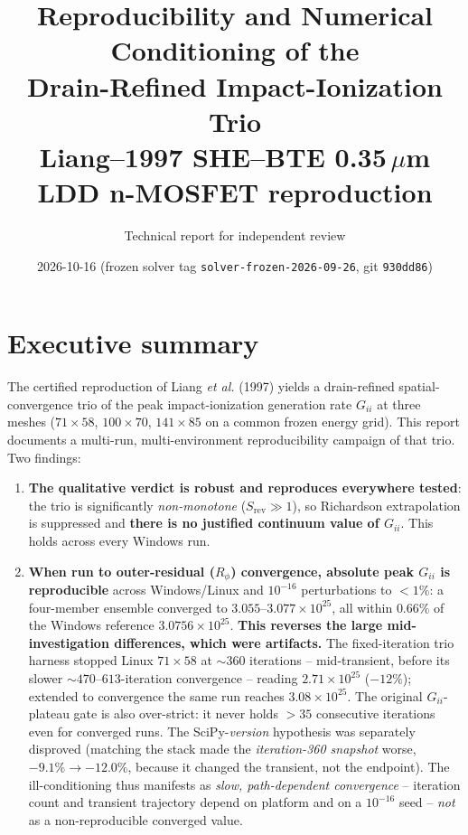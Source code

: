 \documentclass[11pt]{article}
\title{\textbf{Reproducibility and Numerical Conditioning of the\\ Drain-Refined Impact-Ionization Trio}\\[2pt]
\large Liang--1997 SHE--BTE 0.35\,$\mu$m LDD n-MOSFET reproduction}
\author{Technical report for independent review}
\date{2026-10-16 \quad(frozen solver tag \texttt{solver-frozen-2026-09-26}, git \texttt{930dd86})}
\newcommand{\ten}[1]{\times 10^{#1}}
\begin{document}
\maketitle

\section*{Executive summary}
The certified reproduction of Liang \emph{et al.} (1997) yields a drain-refined spatial-convergence trio of the peak impact-ionization generation rate $G_{ii}$ at three meshes ($71\times58$, $100\times70$, $141\times85$ on a common frozen energy grid). This report documents a multi-run, multi-environment reproducibility campaign of that trio. Two findings:

\begin{enumerate}[nosep]
\item \textbf{The qualitative verdict is robust and reproduces everywhere tested}: the trio is significantly \emph{non-monotone} ($S_{\mathrm{rev}}\gg1$), so Richardson extrapolation is suppressed and \textbf{there is no justified continuum value of $G_{ii}$}. This holds across every Windows run.
\item \textbf{When run to outer-residual ($R_\phi$) convergence, absolute peak $G_{ii}$ is reproducible} across Windows/Linux and $10^{-16}$ perturbations to $<1\%$: a four-member ensemble converged to $3.055$--$3.077\ten{25}$, all within $0.66\%$ of the Windows reference $3.0756\ten{25}$. \textbf{This reverses the large mid-investigation differences, which were artifacts.} The fixed-iteration trio harness stopped Linux $71\times58$ at $\sim360$ iterations -- mid-transient, before its slower $\sim\!470$--$613$-iteration convergence -- reading $2.71\ten{25}$ ($-12\%$); extended to convergence the same run reaches $3.08\ten{25}$. The original $G_{ii}$-plateau gate is also over-strict: it never holds $>35$ consecutive iterations even for converged runs. The SciPy-\emph{version} hypothesis was separately disproved (matching the stack made the \emph{iteration-360 snapshot} worse, $-9.1\%\to-12.0\%$, because it changed the transient, not the endpoint). The ill-conditioning thus manifests as \emph{slow, path-dependent convergence} -- iteration count and transient trajectory depend on platform and on a $10^{-16}$ seed -- \emph{not} as a non-reproducible converged value.
\end{enumerate}
\end{document}
